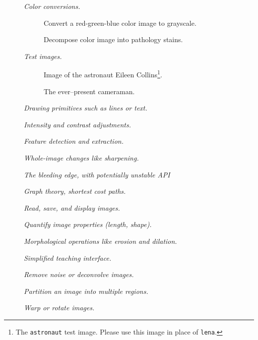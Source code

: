 \documentclass[nohyper, %
               ]{tufte-handout}
\begin{document}
  \begin{description}
    \item[] \textit{Color conversions.}
    \begin{description}
      \item[] Convert a red-green-blue color image to grayscale.
      \item[] Decompose color image into pathology stains.
    \end{description}
    \item[] \textit{Test images.}
    \begin{description}
      \item[] Image of the astronaut Eileen Collins\footnote[1][-0.3cm]{The \texttt{astronaut} test image. Please use this image in place of \texttt{lena}.}.
      \item[] The ever--present cameraman.
    \end{description}
    \item[] \textit{Drawing primitives such as lines or text.}
    \item[] \textit{Intensity and contrast adjustments.}
    \item[] \textit{Feature detection and extraction.}
    \item[] \textit{Whole-image changes like sharpening.}
    \item[] \textit{The bleeding edge, with potentially unstable API}
    \item[] \textit{Graph theory, shortest cost paths.}
    \item[] \textit{Read, save, and display images.}
    \item[] \textit{Quantify image properties (length, shape).}
    \item[] \textit{Morphological operations like erosion and dilation.}
    \item[] \textit{Simplified teaching interface.}
    \item[] \textit{Remove noise or deconvolve images.}
    \item[] \textit{Partition an image into multiple regions.}
    \item[] \textit{Warp or rotate images.}

\end{description}
\end{document}

